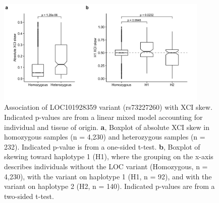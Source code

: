 \begin{figure}[ht!]
    \centering
    \includegraphics[width=0.9\textwidth]{chapter4/Figures/Supplementary_Figure_4.png}
    \caption{
        Association of LOC101928359 variant (rs73227260) with XCI skew. Indicated p-values are from a linear mixed model accounting for individual and tissue of origin.
        \textbf{a}, Boxplot of absolute XCI skew in homozygous samples (n = 4,230) and heterozygous samples (n = 232). Indicated p-value is from a one-sided t-test.
        \textbf{b}, Boxplot of skewing toward haplotype 1 (H1), where the grouping on the x-axis describes individuals without the LOC variant (Homozygous, n = 4,230), with the variant on haplotype 1 (H1, n = 92), and with the variant on haplotype 2 (H2, n = 140). Indicated p-values are from a two-sided t-test.  
    }
    \label{fig:supp_fig4.4}
\end{figure}